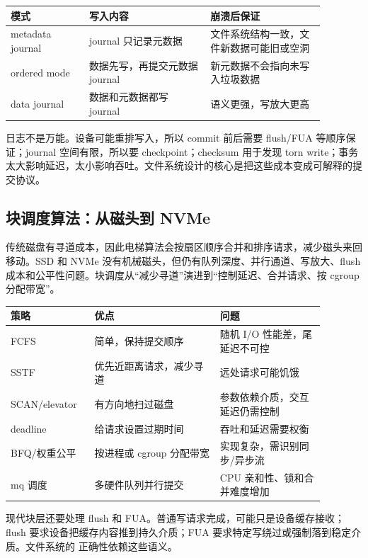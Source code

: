 \begin{longtable}{|p{0.22\linewidth}|p{0.34\linewidth}|p{0.32\linewidth}|}
\toprule
模式 & 写入内容 & 崩溃后保证 \\
\midrule
metadata journal & journal 只记录元数据 & 文件系统结构一致，文件新数据可能旧或空洞 \\\tablerowrule
ordered mode & 数据先写，再提交元数据 journal & 新元数据不会指向未写入垃圾数据 \\\tablerowrule
data journal & 数据和元数据都写 journal & 语义更强，写放大更高 \\
\bottomrule
\end{longtable}

日志不是万能。设备可能重排写入，所以 commit 前后需要 flush/FUA 等顺序保证；journal 空间有限，所以要 checkpoint；checksum 用于发现 torn write；事务太大影响延迟，太小影响吞吐。文件系统设计的核心是把这些成本变成可解释的提交协议。

\subsection{块调度算法：从磁头到 NVMe}

传统磁盘有寻道成本，因此电梯算法会按扇区顺序合并和排序请求，减少磁头来回移动。SSD 和 NVMe 没有机械磁头，但仍有队列深度、并行通道、写放大、flush 成本和公平性问题。块调度从“减少寻道”演进到“控制延迟、合并请求、按 cgroup 分配带宽”。

\begin{longtable}{|p{0.22\linewidth}|p{0.36\linewidth}|p{0.3\linewidth}|}
\toprule
策略 & 优点 & 问题 \\
\midrule
FCFS & 简单，保持提交顺序 & 随机 I/O 性能差，尾延迟不可控 \\\tablerowrule
SSTF & 优先近距离请求，减少寻道 & 远处请求可能饥饿 \\\tablerowrule
SCAN/elevator & 有方向地扫过磁盘 & 参数依赖介质，交互延迟仍需控制 \\\tablerowrule
deadline & 给请求设置过期时间 & 吞吐和延迟需要权衡 \\\tablerowrule
BFQ/权重公平 & 按进程或 cgroup 分配带宽 & 实现复杂，需识别同步/异步流 \\\tablerowrule
mq 调度 & 多硬件队列并行提交 & CPU 亲和性、锁和合并难度增加 \\
\bottomrule
\end{longtable}

现代块层还要处理 flush 和 FUA。普通写请求完成，可能只是设备缓存接收；flush 要求设备把缓存内容推到持久介质；FUA 要求特定写绕过或强制落到稳定介质。文件系统的  正确性依赖这些语义。

